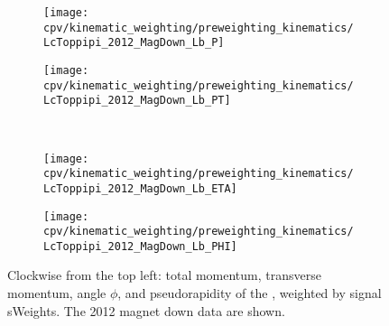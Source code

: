 \begin{sidewaystable}
  \centering
  \caption{%
    Statistics computed on the weighted \ppipi\ data for all data sub-samples
    used in the analysis.
    The quantities are defined in \cref{chap:cpv:kinematic_weighting:stats}.
  }
  \label{tab:cpv:kinematic_weighting:validation:stats}
  
\end{sidewaystable}

\clearpage

\begin{figure}
  \begin{subfigure}[b]{0.4\textwidth}
    \texttt{[image: cpv/kinematic\_weighting/preweighting\_kinematics/LcToppipi\_2012\_MagDown\_Lb\_P]}
    \label{fig:cpv:kinematic_weighting:pre:Lb:P}
  \end{subfigure}
  \begin{subfigure}[b]{0.4\textwidth}
    \texttt{[image: cpv/kinematic\_weighting/preweighting\_kinematics/LcToppipi\_2012\_MagDown\_Lb\_PT]}
    \label{fig:cpv:kinematic_weighting:pre:Lb:PT}
  \end{subfigure}\\
  \begin{subfigure}[b]{0.4\textwidth}
    \texttt{[image: cpv/kinematic\_weighting/preweighting\_kinematics/LcToppipi\_2012\_MagDown\_Lb\_ETA]}
    \label{fig:cpv:kinematic_weighting:pre:Lb:ETA}
  \end{subfigure}
  \begin{subfigure}[b]{0.4\textwidth}
    \texttt{[image: cpv/kinematic\_weighting/preweighting\_kinematics/LcToppipi\_2012\_MagDown\_Lb\_PHI]}
    \label{fig:cpv:kinematic_weighting:pre:Lb:PHI}
  \end{subfigure}
  \caption{%
    Clockwise from the top left: total momentum, transverse momentum, angle
    $\phi$, and pseudorapidity of the \PLambdab, weighted by signal sWeights.
    The 2012 magnet down data are shown.
  }
  \label{fig:cpv:kinematic_weighting:pre:Lb}
\end{figure}


